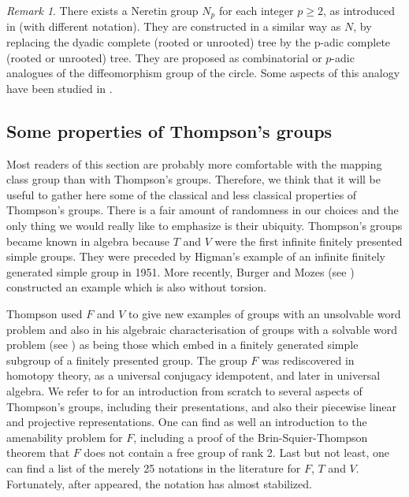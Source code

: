\documentclass[twoside]{irmaems}
\theoremstyle{plain}
\theoremstyle{definition}
\theoremstyle{remark}
\newtheorem{remark}[theorem]{Remark}
\begin{document}
\begin{remark}
There exists a Neretin group  $N_{p}$ for each integer $p\geq 2$, as introduced in \cite{ne} (with different notation). 
They are constructed in a similar way as $N$, by replacing 
the dyadic complete (rooted or unrooted) tree by the p-adic complete (rooted or unrooted) tree.
They are proposed as combinatorial  or $p$-adic analogues of the diffeomorphism group of the circle.
Some aspects of this analogy have been studied in \cite{ka0}.
\end{remark}





\subsection{Some properties of Thompson's groups}
Most readers of this section are probably more comfortable with the
mapping class group than with Thompson's groups. 
Therefore, we think that it will be useful to
gather here some of the classical and less classical properties 
of Thompson's groups. 
There is a fair amount of randomness in our choices  
and the only thing we would really like  to emphasize  is their ubiquity.
Thompson's groups became known in algebra because $T$ and $V$ 
were the first  infinite finitely presented simple groups. 
They were preceded by Higman's example
of an infinite finitely generated simple group in 1951. 
More recently, Burger and Mozes (see \cite{burg-mozes}) 
constructed an example which is also without torsion.

\vspace{0.1cm}\noindent 
Thompson used $F$ and $V$ to give new examples of groups with
an unsolvable word problem and also in his algebraic characterisation of 
groups with a solvable word problem (see \cite{T}) as  being those which  
embed in a finitely generated simple subgroup of a finitely presented group. 
The group $F$ was rediscovered in homotopy theory, as a universal conjugacy
idempotent, and later in universal algebra.
We refer to \cite{ca-fl-pa} for an  introduction from scratch to several
aspects of Thompson's groups, including their presentations, and also their
piecewise linear and projective representations. 
One can find as well an introduction to
the amenability problem for $F$, including a proof of the
Brin-Squier-Thompson theorem that $F$ does not contain a 
free group of rank 2. Last but not
least, one can find a list of the merely 25 notations in the literature for
$F$, $T$ and $V$. Fortunately, after \cite{ca-fl-pa} appeared, 
the notation has almost
stabilized.
\end{document}
